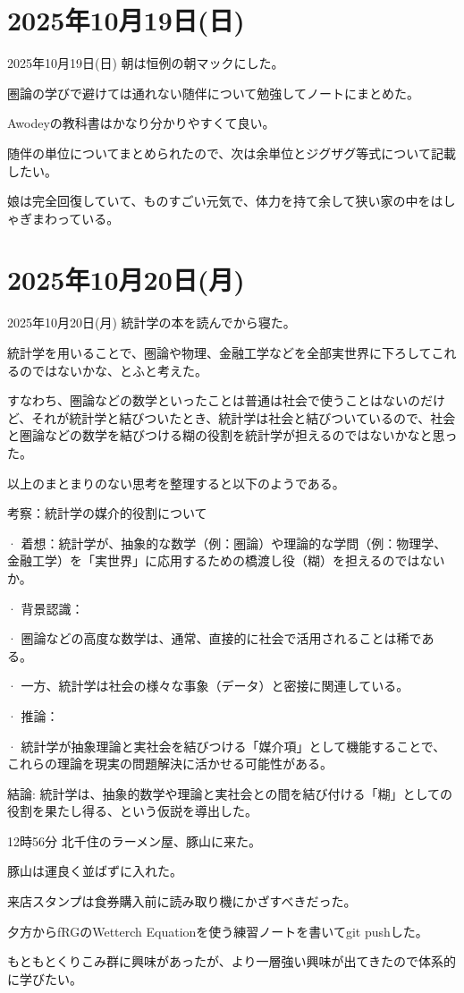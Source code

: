 \documentclass[dvipdfmx, autodetect-engine, aspectratio=169, 10.5pt]{beamer}
\begin{document}
\section{2025年10月19日(日)}

\begin{frame}{2025年10月19日(日)}
	朝は恒例の朝マックにした。

	圏論の学びで避けては通れない随伴について勉強してノートにまとめた。

	Awodeyの教科書はかなり分かりやすくて良い。

	随伴の単位についてまとめられたので、次は余単位とジグザグ等式について記載したい。

	娘は完全回復していて、ものすごい元気で、体力を持て余して狭い家の中をはしゃぎまわっている。
\end{frame}

\section{2025年10月20日(月)}

\begin{frame}{2025年10月20日(月)}
	\scriptsize
	統計学の本を読んでから寝た。

	統計学を用いることで、圏論や物理、金融工学などを全部実世界に下ろしてこれるのではないかな、とふと考えた。

	すなわち、圏論などの数学といったことは普通は社会で使うことはないのだけど、それが統計学と結びついたとき、統計学は社会と結びついているので、社会と圏論などの数学を結びつける糊の役割を統計学が担えるのではないかなと思った。

	以上のまとまりのない思考を整理すると以下のようである。

	考察：統計学の媒介的役割について

	· 着想：統計学が、抽象的な数学（例：圏論）や理論的な学問（例：物理学、金融工学）を「実世界」に応用するための橋渡し役（糊）を担えるのではないか。

	· 背景認識：

	· 圏論などの高度な数学は、通常、直接的に社会で活用されることは稀である。

	· 一方、統計学は社会の様々な事象（データ）と密接に関連している。

	· 推論：

	· 統計学が抽象理論と実社会を結びつける「媒介項」として機能することで、これらの理論を現実の問題解決に活かせる可能性がある。

	結論:
	統計学は、抽象的数学や理論と実社会との間を結び付ける「糊」としての役割を果たし得る、という仮説を導出した。

	12時56分
	北千住のラーメン屋、豚山に来た。

	豚山は運良く並ばずに入れた。

	来店スタンプは食券購入前に読み取り機にかざすべきだった。

	夕方からfRGのWetterch Equationを使う練習ノートを書いてgit pushした。

	もともとくりこみ群に興味があったが、より一層強い興味が出てきたので体系的に学びたい。
\end{frame}
\end{document}
